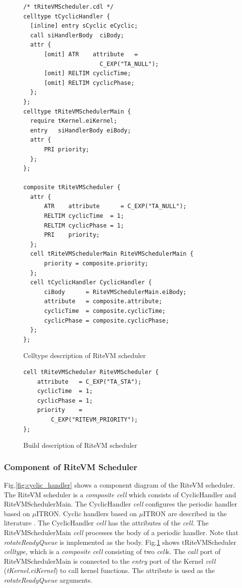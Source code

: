 \documentclass[S,R,E]{article/compsoft}
\begin{document}
\begin{figure}[t]
    \centering
    \begin{lstlisting}
/* tRiteVMScheduler.cdl */
celltype tCyclicHandler {
  [inline] entry sCyclic eCyclic;
  call siHandlerBody  ciBody;
  attr {
      [omit] ATR    attribute   =
                      C_EXP("TA_NULL");
      [omit] RELTIM cyclicTime;
      [omit] RELTIM cyclicPhase;
  };
};
celltype tRiteVMSchedulerMain {
  require tKernel.eiKernel;
  entry   siHandlerBody eiBody;
  attr {
      PRI priority;
  };
};

composite tRiteVMScheduler {
  attr {
      ATR    attribute      = C_EXP("TA_NULL");
      RELTIM cyclicTime  = 1;
      RELTIM cyclicPhase = 1;
      PRI    priority;
  };
  cell tRiteVMSchedulerMain RiteVMSchedulerMain {
      priority = composite.priority;
  };
  cell tCyclicHandler CyclicHandler {
      ciBody      = RiteVMSchedulerMain.eiBody;
      attribute   = composite.attribute;
      cyclicTime  = composite.cyclicTime;
      cyclicPhase = composite.cyclicPhase;
  };
};
\end{lstlisting}
\caption{Celltype description of RiteVM scheduler}
\label{celltype_cyclic_handler}
\end{figure}
\begin{figure}[t]
    \centering
    \begin{lstlisting}
cell tRiteVMScheduler RiteVMScheduler {
    attribute   = C_EXP("TA_STA");
    cyclicTime  = 1;
    cyclicPhase = 1;
    priority    =
        C_EXP("RITEVM_PRIORITY");
};
\end{lstlisting}
\caption{Build description of RiteVM scheduler}
\label{build_cyclic_handler}
\end{figure}

\subsubsection{Component of RiteVM Scheduler}

Fig.\ref{fig:cyclic_handler} shows a component diagram of the RiteVM scheduler.
The RiteVM scheduler is a {\it composite cell} which consists of CyclicHandler and RiteVMSchedulerMain.
The CyclicHandler {\it cell} configures the periodic handler based on $\mu$ITRON.
Cyclic handlers based on $\mu$ITRON are described in the literature \cite{par:microITRON}.
The CyclicHandler {\it cell} has the attributes of the {\it cell}.
The RiteVMSchedulerMain {\it cell} processes the body of a periodic handler.
Note that {\it rotateReadyQueue} is implemented as the body.
Fig.\ref{celltype_cyclic_handler} shows tRiteVMScheduler {\it celltype}, which is a {\it composite cell} consisting of two {\it cell}s.
The {\it call} port of RiteVMSchedulerMain is connected to the {\it entry} port of the Kernel {\it cell} ({\it tKernel.eiKernel}) to call kernel functions.
The attribute is used as the {\it rotateReadyQueue} arguments.
\end{document}
